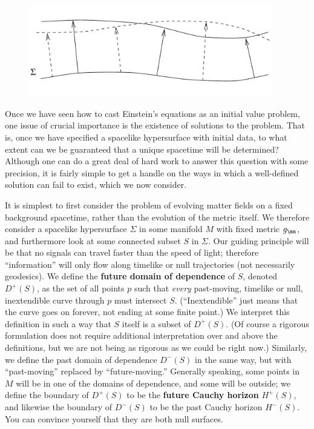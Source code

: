 \documentclass[12pt]{article}
\begin{document}
\begin{figure}
  \centerline{
  \includegraphics[height=4cm]{pdf/four10}}
\end{figure}

Once we have seen how to cast Einstein's equations as an initial
value problem, one issue of crucial importance is the existence of
solutions to the problem.  That is, once we have specified a spacelike
hypersurface with initial data, to what extent can we be guaranteed
that a unique spacetime will be determined?  Although one can do a 
great deal of hard work to answer this question with some precision,
it is fairly simple to get a handle on the ways in which a well-defined
solution can fail to exist, which we now consider.

It is simplest to first consider the problem of evolving matter fields
on a fixed background spacetime, rather than the evolution of the
metric itself.  We therefore consider a spacelike hypersurface $\Sigma$
in some manifold $M$ with fixed metric $g_\mn$, and furthermore look
at some connected subset $S$ in $\Sigma$.  Our guiding principle will
be that no signals can travel faster than the speed of light; therefore
``information'' will only flow along timelike or null trajectories
(not necessarily geodesics).  We define the {\bf future domain of
dependence} of $S$, denoted $D^+(S)$, as the set of all points $p$ such
that {\it every} past-moving, timelike or null, inextendible curve through
$p$ must intersect $S$.  (``Inextendible'' just means that the curve
goes on forever, not ending at some finite point.)  We interpret this
definition in such a way that $S$ itself is a subset of $D^+(S)$.  (Of
course a rigorous formulation does not require additional interpretation
over and above the definitions, but we are not being as rigorous
as we could be right now.)  Similarly, we 
define the past domain of dependence $D^-(S)$ in the same way, but
with ``past-moving'' replaced by ``future-moving.''  Generally
speaking, some points in $M$ will be in one of the domains of dependence,
and some will be outside; we define the boundary of $D^+(S)$ to be
the {\bf future Cauchy horizon} $H^+(S)$, and likewise the boundary of 
$D^-(S)$ to be the past Cauchy horizon $H^-(S)$.  You can convince
yourself that they are both null surfaces.
\end{document}
